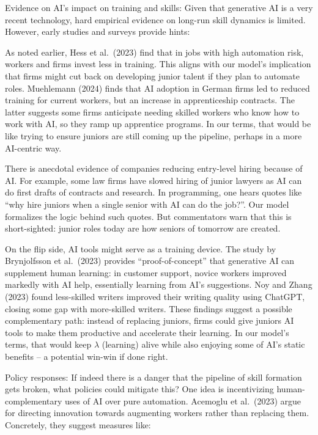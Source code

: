 \documentclass[12pt]{article}
\begin{document}
{Evidence on AI's impact on training and skills:} Given that
generative AI is a very recent technology, hard empirical evidence on
long-run skill dynamics is limited. However, early studies and surveys
provide hints:

As noted earlier, Hess et al.~(2023) find that in jobs with high
automation risk, {workers and firms invest less in training}.
This aligns with our model's implication that firms might cut back
on developing junior talent if they plan to automate roles.
Muehlemann (2024) finds that {AI adoption in German firms led
to reduced training for current workers, but an increase in
apprenticeship contracts}. The latter suggests some firms anticipate
needing skilled workers who know how to work with AI, so they ramp
up apprentice programs. In our terms, that would be like trying to
ensure juniors are still coming up the pipeline, perhaps in a more
AI-centric way.

There is anecdotal evidence of companies {reducing
entry-level hiring} because of AI. For example, some law firms have
slowed hiring of junior lawyers as AI can do first drafts of
contracts and research. In programming, one hears quotes like
{``why hire juniors when a single senior with AI can do the
job?''}. Our model formalizes the logic behind such quotes. But
commentators warn that this is short-sighted: junior roles today are
how seniors of tomorrow are created.

On the flip side, AI tools might serve as a {training device}.
The study by Brynjolfsson et al.~(2023) provides
{``proof-of-concept'' that generative AI can supplement human
learning}: in customer support, novice workers improved markedly
with AI help, essentially learning from AI's suggestions. Noy and
Zhang (2023) found less-skilled writers improved their writing
quality using ChatGPT, closing some gap with more-skilled writers.
These findings suggest a possible {complementary} path: instead
of replacing juniors, firms could give juniors AI tools to make them
productive and accelerate their learning. In our model's terms, that
would keep \(\lambda\) (learning) alive while also enjoying some of
AI's static benefits -- a potential win-win if done right.

{Policy responses:} If indeed there is a danger that the
pipeline of skill formation gets broken, what policies could mitigate
this? One idea is {incentivizing human-complementary uses of
AI} over pure automation. Acemoglu et al.~(2023) argue for directing
innovation towards augmenting workers rather than replacing them.
Concretely, they suggest measures like:
\end{document}
